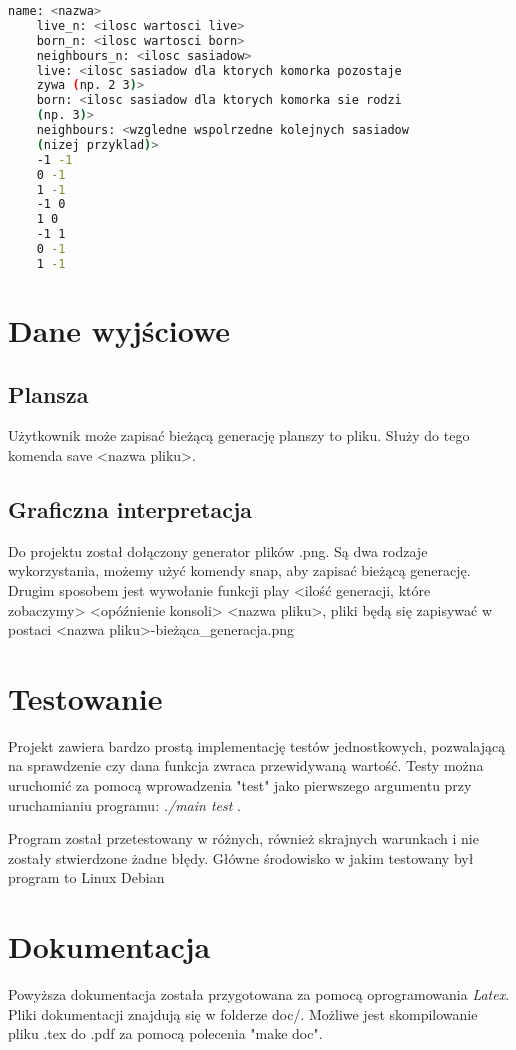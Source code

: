 \documentclass{article}
\begin{document}
\begin{lstlisting}[language=bash]
    name: <nazwa>
    live_n: <ilosc wartosci live>
    born_n: <ilosc wartosci born>
    neighbours_n: <ilosc sasiadow>
    live: <ilosc sasiadow dla ktorych komorka pozostaje 
    zywa (np. 2 3)>
    born: <ilosc sasiadow dla ktorych komorka sie rodzi 
    (np. 3)>
    neighbours: <wzgledne wspolrzedne kolejnych sasiadow 
    (nizej przyklad)>
    -1 -1
    0 -1
    1 -1
    -1 0
    1 0
    -1 1
    0 -1
    1 -1
\end{lstlisting}

\section{Dane wyjściowe}
\subsection{Plansza}
Użytkownik może zapisać bieżącą generację planszy to pliku. Służy do tego komenda save <nazwa pliku>.
\subsection{Graficzna interpretacja}
Do projektu został dołączony generator plików .png. Są dwa rodzaje wykorzystania, możemy użyć komendy snap, aby zapisać bieżącą generację. Drugim sposobem jest wywołanie funkcji play <ilość generacji, które zobaczymy> <opóźnienie konsoli> <nazwa pliku>, pliki będą się zapisywać w postaci <nazwa pliku>-bieżąca\_generacja.png

\section{Testowanie}
Projekt zawiera bardzo prostą implementację testów jednostkowych, pozwalającą na sprawdzenie czy dana funkcja zwraca przewidywaną wartość. Testy można uruchomić za pomocą wprowadzenia "test" jako pierwszego argumentu przy uruchamianiu programu: \textit{./main test} .

Program został przetestowany w różnych, również skrajnych warunkach i nie zostały stwierdzone żadne błędy. Główne środowisko w jakim testowany był program to Linux Debian 

\section{Dokumentacja}
Powyższa dokumentacja została przygotowana za pomocą oprogramowania \textit{Latex}. Pliki dokumentacji znajdują się w folderze doc/. Możliwe jest skompilowanie pliku .tex do .pdf za pomocą polecenia "make doc". 
\end{document}
